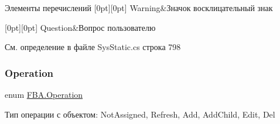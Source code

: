 \begin{DoxyEnumFields}{Элементы перечислений}
[0pt][0pt]{}\mbox{\label{namespace_f_b_a_acb769874aa087305188bab1a2e276d6ba0eaadb4fcb48a0a0ed7bc9868be9fbaa}} 
Warning&Значок восклицательный знак \\
\hline

[0pt][0pt]{}\mbox{\label{namespace_f_b_a_acb769874aa087305188bab1a2e276d6baa97ea56b0e00b2379736ae60869ff66a}} 
Question&Вопрос пользователю \\
\hline

\end{DoxyEnumFields}


См. определение в файле Sys\+Static.\+cs строка 798

\mbox{\label{namespace_f_b_a_a82a9536170086556d110a52b7698a776}} 
\subsubsection{\texorpdfstring{Operation}{Operation}}
{\footnotesize\ttfamily enum \mbox{\hyperlink{namespace_f_b_a_a82a9536170086556d110a52b7698a776}{F\+B\+A.\+Operation}}\hspace{0.3cm}{\ttfamily [strong]}}



Тип операции с объектом\+: Not\+Assigned, Refresh, Add, Add\+Child, Edit, Del 

